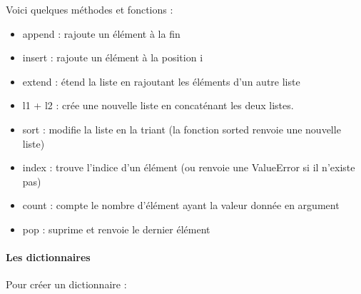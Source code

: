 \documentclass[letterpaper,10pt,english]{sphinxhowto}
\begin{document}
\sphinxAtStartPar
Voici quelques méthodes et fonctions :
\begin{itemize}
\item {} 
\sphinxAtStartPar
append : rajoute un élément à la fin

\item {} 
\sphinxAtStartPar
insert : rajoute un élément à la position i

\item {} 
\sphinxAtStartPar
extend : étend la liste en rajoutant les éléments d’un autre liste

\item {} 
\sphinxAtStartPar
l1 + l2 : crée une nouvelle liste en concaténant les deux listes.

\item {} 
\sphinxAtStartPar
sort : modifie la liste en la triant (la fonction sorted renvoie une nouvelle liste)

\item {} 
\sphinxAtStartPar
index : trouve l’indice d’un élément (ou renvoie une ValueError si il n’existe pas)

\item {} 
\sphinxAtStartPar
count : compte le nombre d’élément ayant la valeur donnée en argument

\item {} 
\sphinxAtStartPar
pop : suprime et renvoie le dernier élément

\end{itemize}


\paragraph{Les dictionnaires}
\label{\detokenize{cours3_conteneur_cours:les-dictionnaires}}
\sphinxAtStartPar
Pour créer un dictionnaire :

\begin{sphinxVerbatim}[commandchars=\\\{\}]
   
   
  \PYG{p}{[}   \PYG{p}{]}
  
\end{sphinxVerbatim}
\end{document}
